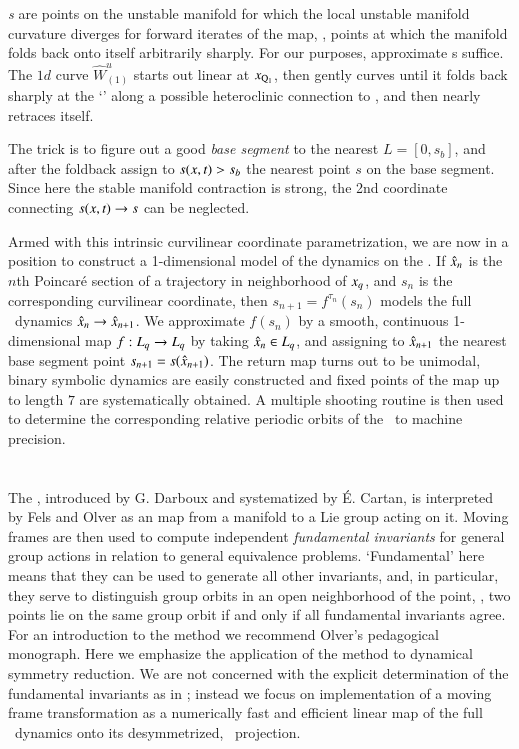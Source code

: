 \documentclass[preprint,number,sort&compress]{elsarticle}
\begin{document}
{\em \Turn s} are points on the unstable
manifold for which the local unstable manifold curvature diverges
for forward iterates of the map, \ie, points at which the manifold
folds back onto itself arbitrarily sharply.
For our purposes,
approximate \turn s suffice.
The $1d$ curve $\hat{W}^u_{(1)}$ starts out linear at
$x_{\mathrm{Q}_{1}}$, then gently curves until it folds back sharply
at the `\turn' along a possible heteroclinic connection to ,
and then nearly retraces itself.

The trick is to figure out a good {\em base segment} to the
nearest {\turn} $L=[0,s_{b}]$, and after the foldback assign
to $s(x,t)>s_{b}$ the nearest point $s$ on the base
segment. Since here the stable manifold contraction is strong, the
2nd coordinate connecting $s(x,t) \to s$ can be neglected.

Armed with this intrinsic curvilinear coordinate
parametrization, we are now in a position to construct a
1-dimensional model of the dynamics on the \nws. If
$\hat{x}_n$ is the $n$th Poincar\'e section of a
trajectory in neighborhood of $x_q$, and $s_n$ is the
corresponding curvilinear coordinate, then $s_{n+1} = f^{\tau_n}(s_n)$
models the full \statesp\ dynamics $\hat{x}_n \to
\hat{x}_{n+1}$. We approximate $f(s_n)$ by a smooth,
continuous 1-dimensional map $f : L_q \to L_q$ by taking
$\hat{x}_n \in L_q$, and assigning to
$\hat{x}_{n+1}$ the nearest base segment point
$s_{n+1}=s(\hat{x}_{n+1})$. The return map turns out to
be unimodal,  binary symbolic dynamics are easily constructed
and fixed points of the map up to length
$7$ are systematically obtained. A multiple shooting routine is then
used to determine the corresponding relative periodic orbits of
the \cLe\ to machine precision.


\section{\label{sec:mf} \Mframes}

The \mframes, introduced by G. Darboux and systematized by \'E.
Cartan, is interpreted by Fels and
Olver as an map from a manifold to a Lie
group acting on it. Moving frames are then used to compute
independent \emph{fundamental invariants} for
general group actions in relation to general equivalence problems.
`Fundamental' here means that they can be used to generate all other
invariants, and, in particular, they serve to distinguish group orbits
in an open neighborhood of the {\slice} point, \ie, two points lie on
the same group orbit if and only if all fundamental invariants agree.
For an introduction to the method we recommend Olver's pedagogical
monograph. Here we emphasize the application of the
method to dynamical symmetry reduction. We are not concerned with the
explicit determination of the fundamental invariants as in
; instead we focus on implementation
of a moving frame transformation as a numerically fast and efficient
linear map of the full \statesp\ dynamics onto its desymmetrized,
\reducedsp\ projection.
\end{document}
